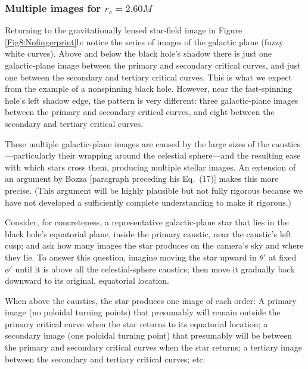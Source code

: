 \documentclass[12pt]{iopart}
\begin{document}
\subsubsection{Multiple images for $r_c=2.60M$}

Returning to the gravitationally lensed star-field image in Figure 
\ref{Fig8:Nofingerprint}b: notice the series of images of the galactic
plane (fuzzy white curves).  Above and below the black hole's shadow there is
just one galactic-plane image between the primary and secondary critical
curves, and just one between the secondary and tertiary critical curves.
This is what we expect from the example of a nonspinning black hole.
However, near the fast-spinning hole's left shadow edge, the pattern is
very different:  three galactic-plane images between the primary and 
secondary critical curves, and eight between the secondary and tertiary
critical curves. 

These multiple galactic-plane images are caused by the 
large sizes of the caustics---particularly their wrapping around the 
celestial sphere---and the resulting ease with which stars cross 
them, producing multiple stellar images.  An extension of an argument
by Bozza \cite{Bozza08} [paragraph preceding his Eq.\ (17)] makes this
more precise. (This argument will be highly plausible but not fully
rigorous because we have not developed a sufficiently complete
understanding to make it rigorous.)

Consider, for concreteness, a representative galactic-plane star that lies 
in the black hole's equatorial plane, inside the primary caustic, 
near the caustic's left cusp; and ask how many images the 
star produces on the camera's sky and where they lie. 
To answer this question, imagine moving the
star upward in $\theta'$ at fixed $\phi'$ until it is above all the celestial-sphere
caustics; then move it gradually back downward to its original, equatorial 
location.

When above the caustics, the star produces one image of each order: A 
primary image (no poloidal turning points) that presumably will remain
outside the primary critical curve when the star returns to its
equatorial location; a secondary image (one poloidal turning point) that
presumably will be between the primary and secondary critical curves
when the star returns; a tertiary image between the secondary and
tertiary critical curves; etc.
\end{document}
